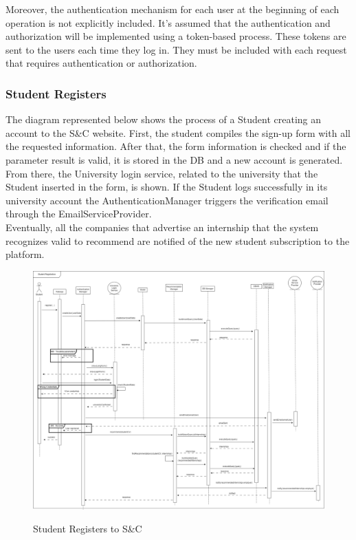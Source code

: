 \documentclass[a4paper,12pt]{article}
\begin{document}
Moreover, the authentication mechanism for each user at the beginning of each operation is not explicitly included. It's assumed that the authentication and authorization will be implemented using a token-based process. These tokens are sent to the users each time they log in. They must be included with each request that requires authentication or authorization.



\subsubsection*{Student Registers}
The diagram represented below shows the process of a Student creating an account to the S\&C website. First, the student compiles the sign-up form with all the requested information. After that, the form information is checked and if the parameter result is valid, it is stored in the DB and a new account is generated. From there, the University login service, related to the university that the Student inserted in the form, is shown. If the Student logs successfully in its university account the AuthenticationManager triggers the verification email through the EmailServiceProvider. 
\\Eventually, all the companies that advertise an internship that the system recognizes valid to recommend are notified of the new student subscription to the platform.
\begin{figure}[H]
\centering
\includegraphics[scale = 0.28]{DD_figures/RuntimeView/StudentRegistrationRV.drawio.png}\\
\caption{Student Registers to S\&C}
\end{figure}
\end{document}
